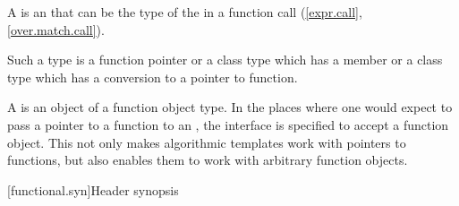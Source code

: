 \pnum
A  is an
 that can be the type of the
 in a function call
(\ref{expr.call}, \ref{over.match.call}).
\begin{footnote}
Such a type is a function
pointer or a class type which has a member  or a class type
which has a conversion to a pointer to function.
\end{footnote}
A  is an
object of a function object type. In the places where one would expect to pass a
pointer to a function to an , the
interface is specified to accept a function object. This not only makes
algorithmic templates work with pointers to functions, but also enables them to
work with arbitrary function objects.

[functional.syn]{Header  synopsis}

